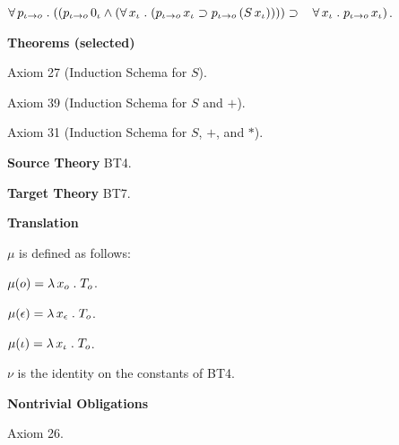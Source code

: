 \begin{biformthy}
    $\forall\, p_{\iota \rightarrow o} \mathrel. ((p_{\iota \rightarrow o} \, 0_\iota \wedge 
    (\forall\, x_\iota \mathrel. (p_{\iota \rightarrow o} \, x_\iota \supset 
    p_{\iota \rightarrow o} \, (S \, x_\iota)))) \supset {}\\
    \hspace*{2ex}\forall\, x_\iota \mathrel. 
    p_{\iota \rightarrow o} \, x_\iota)$.

  \ee

  \item[] \textbf{Theorems (selected)}

  \be

    \setcounter{enumi}{5}

    \item Axiom 27 (Induction Schema for $S$).

    \item Axiom 39 (Induction Schema for $S$ and $+$).

    \item Axiom 31 (Induction Schema for $S$, $+$, and $*$).

  \ee

\ei
\end{biformthy}

\begin{thymorphism}[BT4-to-BT7]\em
\be

  \item[]

  \item[] \textbf{Source Theory} BT4.

  \item[] \textbf{Target Theory} BT7.

  \item[] \textbf{Translation} 

  \bi

    \item[] $\mu$ is defined as follows:

    \bi

      \item[] $\mu(o) = \lambda\, x_o \mathrel. T_o$.

      \item[] $\mu(\epsilon) = \lambda\, x_\epsilon \mathrel. T_o$.

      \item[] $\mu(\iota) = \lambda\, x_\iota \mathrel. T_o$.

    \ei

    $\nu$ is the identity on the constants of BT4.

  \ei

  \item[] \textbf{Nontrivial Obligations} 

  \bi

    \item[] Axiom 26.

  \ei  

\ee
\end{thymorphism}

